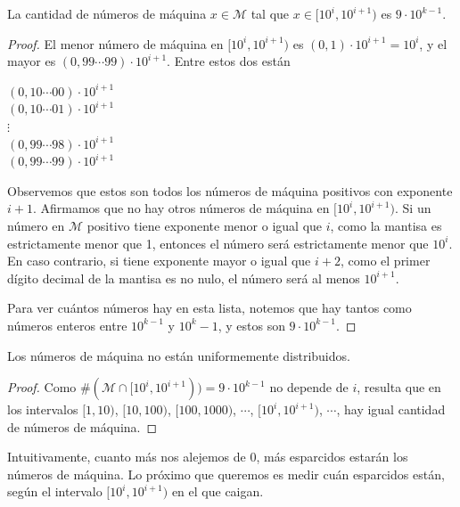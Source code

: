 \begin{propo}
\label{propo:dist}
La cantidad de números de máquina $x \in \mathcal{M}$ tal que $x \in [10^i, 10^{i + 1})$ es $9 \cdot 10^{k - 1}$.

\begin{proof}
El menor número de máquina en $[10^{i}, 10^{i + 1})$ es $(0,1) \cdot 10^{i + 1} = 10^{i}$, y el mayor es $(0,99\cdots 99) \cdot 10^{i + 1}$. Entre estos dos están

\begin{center}
$(0,10\cdots 00) \cdot 10^{i + 1}$\\
$(0,10\cdots 01) \cdot 10^{i + 1}$\\
	$\vdots$\\
$(0,99\cdots 98) \cdot 10^{i + 1}$\\
$(0,99\cdots 99) \cdot 10^{i + 1}$\\
\end{center}

Observemos que estos son todos los números de máquina positivos con exponente $i + 1$. Afirmamos que no hay otros números de máquina en $[10^i, 10^{i + 1})$. Si un número en $\mathcal{M}$ positivo tiene exponente menor o igual que $i$, como la mantisa es estrictamente menor que 1, entonces el número será estrictamente menor que $10^i$. En caso contrario, si tiene exponente mayor o igual que $i + 2$, como el primer dígito decimal de la mantisa es no nulo, el número será al menos $10^{i + 1}$.

Para ver cuántos números hay en esta lista, notemos que hay tantos como números enteros entre $10^{k - 1}$ y $10^{k} - 1$, y estos son $9 \cdot 10^{k - 1}$.
\end{proof}
\end{propo}

\begin{coro}
Los números de máquina no están uniformemente distribuidos.

\begin{proof}
Como $\#(\mathcal{M} \cap [10^i, 10^{i + 1})) = 9 \cdot 10^{k - 1}$ no depende de $i$, resulta que en los intervalos $[1, 10)$, $[10, 100)$, $[100, 1000)$, $\cdots$, $[10^i, 10^{i + 1})$, $\cdots$, hay igual cantidad de números de máquina.
\end{proof}
\end{coro}

Intuitivamente, cuanto más nos alejemos de 0, más esparcidos estarán los números de máquina. Lo próximo que queremos es medir cuán esparcidos están, según el intervalo $[10^i, 10^{i + 1})$ en el que caigan.


